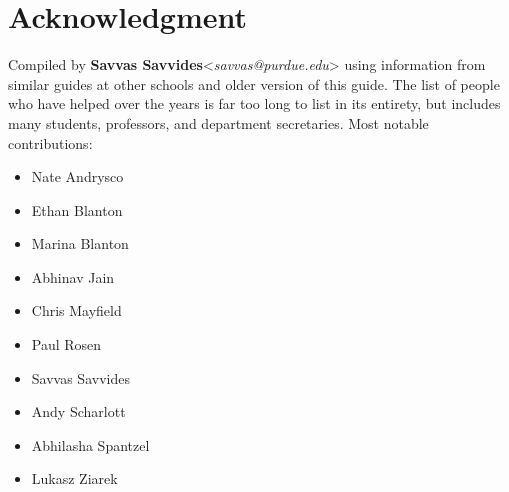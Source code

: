 \section{Acknowledgment}
Compiled by \textbf{Savvas Savvides}<\emph{savvas@purdue.edu}> using information from similar guides at other schools and older version of this guide.
%
The list of people who have helped over the years is far too long to list in its entirety, but includes many students, professors, and department secretaries. Most notable contributions:

\begin{itemize}
\item Nate Andrysco
\item Ethan Blanton
\item Marina Blanton
\item Abhinav Jain
\item Chris Mayfield
\item Paul Rosen
\item Savvas Savvides
\item Andy Scharlott
\item Abhilasha Spantzel
\item Lukasz Ziarek
\end{itemize}